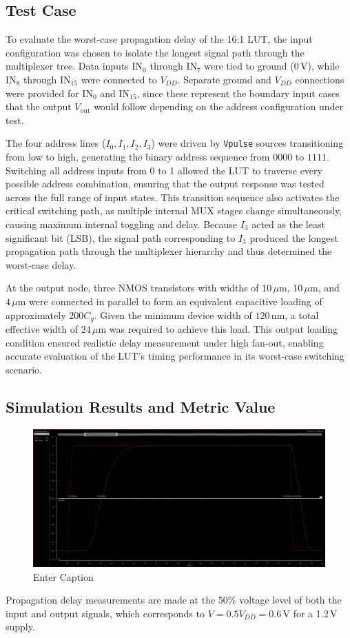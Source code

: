 \documentclass[12pt]{article}
\begin{document}
\subsection{Test Case}
To evaluate the worst-case propagation delay of the 16:1 LUT, the input configuration was chosen to isolate the longest signal path through the multiplexer tree. 
Data inputs \(\text{IN}_0\) through \(\text{IN}_7\) were tied to ground (\(0\,\text{V}\)), while \(\text{IN}_8\) through \(\text{IN}_{15}\) were connected to \(V_{DD}\). 
Separate ground and \(V_{DD}\) connections were provided for \(\text{IN}_0\) and \(\text{IN}_{15}\), since these represent the boundary input cases that the output \(V_{\text{out}}\) would follow depending on the address configuration under test. 

The four address lines (\(I_0, I_1, I_2, I_3\)) were driven by \texttt{Vpulse} sources transitioning from low to high, generating the binary address sequence from \(0000\) to \(1111\). 
Switching all address inputs from 0 to 1 allowed the LUT to traverse every possible address combination, ensuring that the output response was tested across the full range of input states. 
This transition sequence also activates the critical switching path, as multiple internal MUX stages change simultaneously, causing maximum internal toggling and delay. 
Because \(I_3\) acted as the least significant bit (LSB), the signal path corresponding to \(I_3\) produced the longest propagation path through the multiplexer hierarchy and thus determined the worst-case delay.

At the output node, three NMOS transistors with widths of \(10\,\mu\text{m}\), \(10\,\mu\text{m}\), and \(4\,\mu\text{m}\) were connected in parallel to form an equivalent capacitive loading of approximately \(200C_g\). 
Given the minimum device width of \(120\,\text{nm}\), a total effective width of \(24\,\mu\text{m}\) was required to achieve this load. 
This output loading condition ensured realistic delay measurement under high fan-out, enabling accurate evaluation of the LUT’s timing performance in its worst-case switching scenario.

\newpage

\subsection{Simulation Results and Metric Value}
\begin{figure}[H]
    \centering
    \includegraphics[width=0.5\linewidth]{writeup//figures/baselinedelay.png}
    \caption{Enter Caption}
\end{figure}
Propagation delay measurements are made at the 50\% voltage level of both the input and output signals, which corresponds to \( V = 0.5V_{DD} = 0.6\,\text{V} \) for a 1.2\,V supply.
\end{document}
